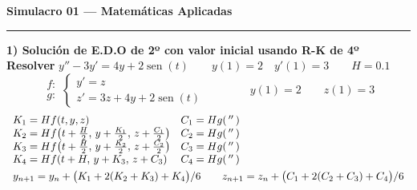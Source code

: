 \documentclass[11pt]{article}
\DeclareMathOperator{\sen}{sen}
\begin{document}
\begin{center}{\Large\textbf{Simulacro 01 --- Matemáticas Aplicadas}}\end{center}
\hrule\vspace{8pt}

{\large\textbf{1) Solución de E.D.O de 2º con valor inicial usando R-K de 4º}}\\[6pt]
\textbf{Resolver} \quad $y''-3y'=4y+2\sen(t) \qquad y(1)=2 \quad y'(1)=3 \qquad H=0.1$\\[4pt]
\[
\begin{array}{r} f:\\[2pt] g:\end{array}\left\{\begin{array}{l} y'=z\\[2pt] z'=3z+4y+2\sen(t)\end{array}\right.
\qquad\qquad y(1)=2 \qquad z(1)=3
\]
\[
\begin{array}{ll}
K_1=Hf(t,y,z) & C_1=Hg(\,''\,)\\
K_2=Hf\!\left(t+\frac{H}{2},\,y+\frac{K_1}{2},\,z+\frac{C_1}{2}\right) & C_2=Hg(\,''\,)\\
K_3=Hf\!\left(t+\frac{H}{2},\,y+\frac{K_2}{2},\,z+\frac{C_2}{2}\right) & C_3=Hg(\,''\,)\\
K_4=Hf(t+H,\,y+K_3,\,z+C_3) & C_4=Hg(\,''\,)\\[4pt]
\multicolumn{2}{l}{y_{n+1}=y_n+\big(K_1+2(K_2+K_3)+K_4\big)/6 \qquad z_{n+1}=z_n+\big(C_1+2(C_2+C_3)+C_4\big)/6}
\end{array}
\]
\end{document}

